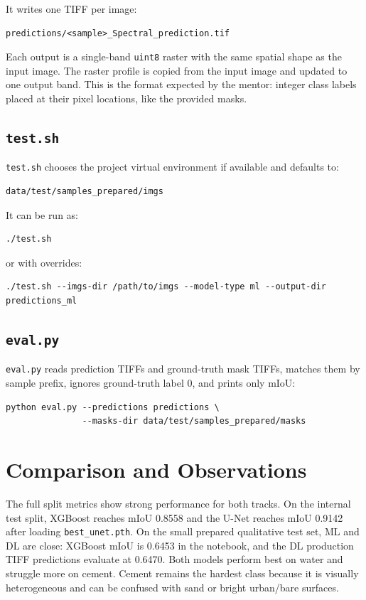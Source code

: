 \documentclass[11pt,a4paper]{article}
\begin{document}
It writes one TIFF per image:
\begin{verbatim}
predictions/<sample>_Spectral_prediction.tif
\end{verbatim}

Each output is a single-band \texttt{uint8} raster with the same spatial shape as the input image. The raster profile is copied from the input image and updated to one output band. This is the format expected by the mentor: integer class labels placed at their pixel locations, like the provided masks.

\subsection{\texttt{test.sh}}

\texttt{test.sh} chooses the project virtual environment if available and defaults to:
\begin{verbatim}
data/test/samples_prepared/imgs
\end{verbatim}

It can be run as:
\begin{verbatim}
./test.sh
\end{verbatim}

or with overrides:
\begin{verbatim}
./test.sh --imgs-dir /path/to/imgs --model-type ml --output-dir predictions_ml
\end{verbatim}

\subsection{\texttt{eval.py}}

\texttt{eval.py} reads prediction TIFFs and ground-truth mask TIFFs, matches them by sample prefix, ignores ground-truth label 0, and prints only mIoU:
\begin{verbatim}
python eval.py --predictions predictions \
               --masks-dir data/test/samples_prepared/masks
\end{verbatim}

\section{Comparison and Observations}

The full split metrics show strong performance for both tracks. On the internal test split, XGBoost reaches mIoU 0.8558 and the U-Net reaches mIoU 0.9142 after loading \texttt{best\_unet.pth}. On the small prepared qualitative test set, ML and DL are close: XGBoost mIoU is 0.6453 in the notebook, and the DL production TIFF predictions evaluate at 0.6470. Both models perform best on water and struggle more on cement. Cement remains the hardest class because it is visually heterogeneous and can be confused with sand or bright urban/bare surfaces.
\end{document}
